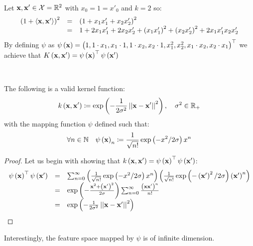 ~\\
\begin{example}
	Let $\mathbf{x},\mathbf{x}'\in \mathcal{X}=\mathbb{R}^2$ with $x_0=1=x'_0$ and $k=2$ so:
	$$ \begin{array}{ccl}
		\left(1+\left\langle \mathbf{x},\mathbf{x}'\right\rangle\right)^2 & = & \left(1+x_1x'_1 + x_2x'_2\right)^2\\
		& = & 1 + 2x_1x'_1 + 2x_2x'_2 + \left(x_1x'_1\right)^2 + \left(x_2x'_2\right)^2 + 2x_1x'_1x_2x'_2
	\end{array} $$
	By defining $\psi$ as $\psi\left(\mathbf{x}\right)=\left(1,1\cdot x_1, x_1 \cdot 1, 1\cdot x_2, x_2\cdot 1, x_1^2, x_2^2, x_1\cdot x_2, x_2 \cdot x_1\right)^\top$ we achieve that $K\left(\mathbf{x},\mathbf{x}'\right)=\psi\left(\mathbf{x}\right)^\top \psi\left(\mathbf{x}'\right)$
\end{example}

~\\
\begin{claim}
	The following is a valid kernel function: $$ k\left(\mathbf{x},\mathbf{x}'\right)\coloneqq \exp\left(-\frac{1}{2\sigma^2}\left|\left| \mathbf{x}-\mathbf{x}'\right|\right|^2\right),\quad\sigma^2\in\mathbb{R}_+ $$ with the mapping function $\psi$ defined such that: $$ \forall n\in\mathbb{N} \quad \psi\left(\mathbf{x}\right)_n \coloneqq \frac{1}{\sqrt{n!}}\exp\left(-x^2/2\sigma\right) x^n $$
\end{claim}
\begin{proof}
	Let us begin with showing that $k\left(\mathbf{x},\mathbf{x}'\right) = \psi\left(\mathbf{x}\right)^\top \psi\left(\mathbf{x}'\right)$:
	$$
	\begin{array}{ccl}
		\psi\left(\mathbf{x}\right)^\top \psi\left(\mathbf{x}'\right) & = & \sum_{n=0}^\infty \left(\frac{1}{\sqrt{n!}}\exp\left(-x^2/2\sigma\right) x^n\right) \left(\frac{1}{\sqrt{n!}}\exp\left(-\left(\mathbf{x}'\right)^2/2\sigma\right) \left(\mathbf{x}'\right)^n\right)\\
		& = & \exp\left(-\frac{\mathbf{x}^2 +\left(\mathbf{x}'\right)^2}{2\sigma}\right)\sum_{n=0}^\infty \frac{\left(\mathbf{x}\mathbf{x}'\right)^n}{n!}\\
		& = & \exp\left(-\frac{1}{2\sigma^2}\left|\left| \mathbf{x}-\mathbf{x}'\right|\right|^2\right)
	\end{array}
	$$
\end{proof}
Interestingly, the feature space mapped by $\psi$ is of infinite dimension.

